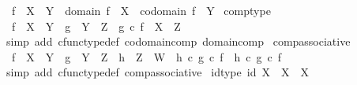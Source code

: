 \begin{isabellebody}
\ \ {\isachardoublequoteopen}{\isacharparenleft}{\kern0pt}f\ {\isacharcolon}{\kern0pt}\ X\ {\isasymrightarrow}\ Y{\isacharparenright}{\kern0pt}\ {\isasymlongleftrightarrow}\ {\isacharparenleft}{\kern0pt}domain\ f\ {\isacharequal}{\kern0pt}\ X\ {\isasymand}\ codomain\ f\ {\isacharequal}{\kern0pt}\ Y{\isacharparenright}{\kern0pt}{\isachardoublequoteclose}\isanewline
\isanewline
{}\isamarkupfalse%
\ comp{\isacharunderscore}{\kern0pt}type{\isacharcolon}{\kern0pt}\isanewline
\ \ {\isachardoublequoteopen}f\ {\isacharcolon}{\kern0pt}\ X\ {\isasymrightarrow}\ Y\ {\isasymLongrightarrow}\ g\ {\isacharcolon}{\kern0pt}\ Y\ {\isasymrightarrow}\ Z\ {\isasymLongrightarrow}\ g\ {\isasymcirc}\isactrlsub c\ f\ {\isacharcolon}{\kern0pt}\ X\ {\isasymrightarrow}\ Z{\isachardoublequoteclose}\isanewline
%
\isadelimproof
\ \ %
\endisadelimproof
%
\isatagproof
{}\isamarkupfalse%
\ {\isacharparenleft}{\kern0pt}simp\ add{\isacharcolon}{\kern0pt}\ cfunc{\isacharunderscore}{\kern0pt}type{\isacharunderscore}{\kern0pt}def\ codomain{\isacharunderscore}{\kern0pt}comp\ domain{\isacharunderscore}{\kern0pt}comp{\isacharparenright}{\kern0pt}%
\endisatagproof
{\isafoldproof}%
%
\isadelimproof
\isanewline
%
\endisadelimproof
\isanewline
{}\isamarkupfalse%
\ comp{\isacharunderscore}{\kern0pt}associative{}{\isacharcolon}{\kern0pt}\isanewline
\ \ {\isachardoublequoteopen}f\ {\isacharcolon}{\kern0pt}\ X\ {\isasymrightarrow}\ Y\ {\isasymLongrightarrow}\ g\ {\isacharcolon}{\kern0pt}\ Y\ {\isasymrightarrow}\ Z\ {\isasymLongrightarrow}\ h\ {\isacharcolon}{\kern0pt}\ Z\ {\isasymrightarrow}\ W\ {\isasymLongrightarrow}\ h\ {\isasymcirc}\isactrlsub c\ {\isacharparenleft}{\kern0pt}g\ {\isasymcirc}\isactrlsub c\ f{\isacharparenright}{\kern0pt}\ {\isacharequal}{\kern0pt}\ {\isacharparenleft}{\kern0pt}h\ {\isasymcirc}\isactrlsub c\ g{\isacharparenright}{\kern0pt}\ {\isasymcirc}\isactrlsub c\ f{\isachardoublequoteclose}\isanewline
%
\isadelimproof
\ \ %
\endisadelimproof
%
\isatagproof
{}\isamarkupfalse%
\ {\isacharparenleft}{\kern0pt}simp\ add{\isacharcolon}{\kern0pt}\ cfunc{\isacharunderscore}{\kern0pt}type{\isacharunderscore}{\kern0pt}def\ comp{\isacharunderscore}{\kern0pt}associative{\isacharparenright}{\kern0pt}%
\endisatagproof
{\isafoldproof}%
%
\isadelimproof
\isanewline
%
\endisadelimproof
\isanewline
{}\isamarkupfalse%
\ id{\isacharunderscore}{\kern0pt}type{\isacharcolon}{\kern0pt}\ {\isachardoublequoteopen}id\ X\ {\isacharcolon}{\kern0pt}\ X\ {\isasymrightarrow}\ X{\isachardoublequoteclose}\isanewline
%
\isadelimproof

\end{isabellebody}
